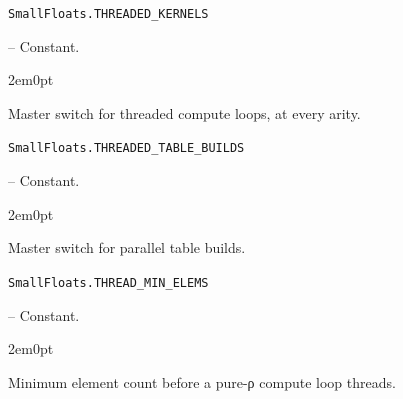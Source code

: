 \par\medskip\noindent\begin{minipage}{\linewidth}
\hypertarget{15945855848429109616}{\texttt{SmallFloats.THREADED\_\allowbreak{}KERNELS}}  -- {Constant.}
\nopagebreak
\begin{adjustwidth}{2em}{0pt}

Master switch for threaded compute loops, at every arity.



\end{adjustwidth}
\end{minipage}
\par\medskip

\par\medskip\noindent\begin{minipage}{\linewidth}
\hypertarget{7928213097002134564}{\texttt{SmallFloats.THREADED\_\allowbreak{}TABLE\_\allowbreak{}BUILDS}}  -- {Constant.}
\nopagebreak
\begin{adjustwidth}{2em}{0pt}

Master switch for parallel table builds.



\end{adjustwidth}
\end{minipage}
\par\medskip

\par\medskip\noindent\begin{minipage}{\linewidth}
\hypertarget{8854710295716658150}{\texttt{SmallFloats.THREAD\_\allowbreak{}MIN\_\allowbreak{}ELEMS}}  -- {Constant.}
\nopagebreak
\begin{adjustwidth}{2em}{0pt}

Minimum element count before a pure-ρ compute loop threads.



\end{adjustwidth}
\end{minipage}
\par\medskip

